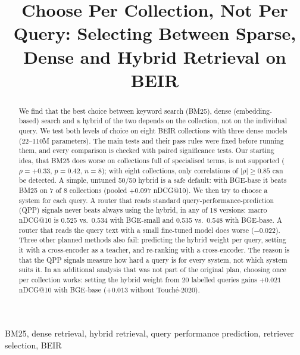 \documentclass[conference]{IEEEtran}
\makeatletter
\newcommand{\ndcg}{nDCG@10}
\makeatother
\begin{document}
\title{Choose Per Collection, Not Per Query: Selecting Between Sparse, Dense and Hybrid Retrieval on BEIR}

\author{
}

\maketitle

\begin{abstract}
We find that the best choice between keyword search (BM25), dense (embedding-based) search and a hybrid of the two depends on the collection, not on the individual query. We test both levels of choice on eight BEIR collections with three dense models (22--110M parameters). The main tests and their pass rules were fixed before running them, and every comparison is checked with paired significance tests. Our starting idea, that BM25 does worse on collections full of specialised terms, is not supported ($\rho=+0.33$, $p=0.42$, $n=8$); with eight collections, only correlations of $|\rho|\geq0.85$ can be detected. A simple, untuned 50/50 hybrid is a safe default: with BGE-base it beats BM25 on 7 of 8 collections (pooled $+0.097$ \ndcg{}). We then try to choose a system for each query. A router that reads standard query-performance-prediction (QPP) signals never beats always using the hybrid, in any of 18 versions: macro \ndcg{} is 0.525 vs.\ 0.534 with BGE-small and 0.535 vs.\ 0.548 with BGE-base. A router that reads the query text with a small fine-tuned model does worse ($-0.022$). Three other planned methods also fail: predicting the hybrid weight per query, setting it with a cross-encoder as a teacher, and re-ranking with a cross-encoder. The reason is that the QPP signals measure how hard a query is for every system, not which system suits it. In an additional analysis that was not part of the original plan, choosing once per collection works: setting the hybrid weight from 20 labelled queries gains $+0.021$ \ndcg{} with BGE-base ($+0.013$ without Touch\'e-2020).
\end{abstract}

\begin{IEEEkeywords}
BM25, dense retrieval, hybrid retrieval, query performance prediction, retriever selection, BEIR
\end{IEEEkeywords}
\end{document}
